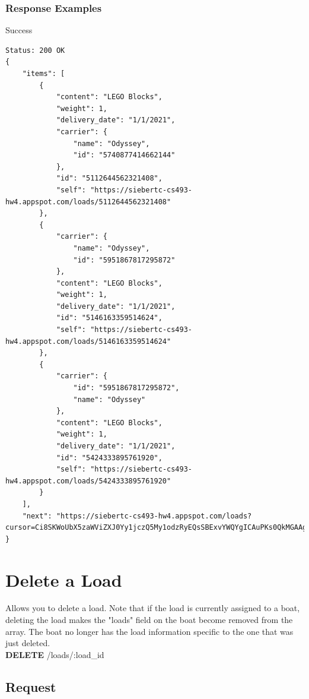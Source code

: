 \documentclass[letterpaper,11pt,titlepage,draftclsnofoot,onecolumn,compsoc,utf8,latin1]{IEEEtran}
\begin{document}
\begin{singlespace}
\subsubsection{Response Examples}

\noindent \Large{Success}

\begin{lstlisting}[]
Status: 200 OK
{
    "items": [
        {
            "content": "LEGO Blocks",
            "weight": 1,
            "delivery_date": "1/1/2021",
            "carrier": {
                "name": "Odyssey",
                "id": "5740877414662144"
            },
            "id": "5112644562321408",
            "self": "https://siebertc-cs493-hw4.appspot.com/loads/5112644562321408"
        },
        {
            "carrier": {
                "name": "Odyssey",
                "id": "5951867817295872"
            },
            "content": "LEGO Blocks",
            "weight": 1,
            "delivery_date": "1/1/2021",
            "id": "5146163359514624",
            "self": "https://siebertc-cs493-hw4.appspot.com/loads/5146163359514624"
        },
        {
            "carrier": {
                "id": "5951867817295872",
                "name": "Odyssey"
            },
            "content": "LEGO Blocks",
            "weight": 1,
            "delivery_date": "1/1/2021",
            "id": "5424333895761920",
            "self": "https://siebertc-cs493-hw4.appspot.com/loads/5424333895761920"
        }
    ],
    "next": "https://siebertc-cs493-hw4.appspot.com/loads?cursor=Ci8SKWoUbX5zaWViZXJ0Yy1jczQ5My1odzRyEQsSBExvYWQYgICAuPKs0QkMGAAgAA=="
}
\end{lstlisting}

\newpage 

\normalsize

\section{Delete a Load}

Allows you to delete a load. Note that if the load is currently assigned to a boat, deleting the load makes the "loads" field on the boat become removed from the array. The boat no longer has the load information specific to the one that was just deleted.\\

\noindent \textbf{DELETE} /loads/:load\_id

\subsection{Request}


\end{singlespace}
\end{document}
